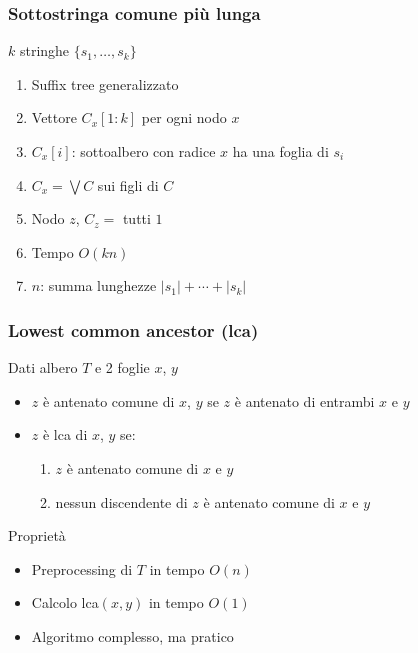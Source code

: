 \begin{frame}[fragile]
\frametitle{Sottostringa comune più lunga}
\begin{block}{$k$ stringhe $\{s_{1}, \ldots , s_{k}\}$}
\begin{enumerate}[<+->]
\item
Suffix tree generalizzato
\item
Vettore $C_{x}[1:k]$ per ogni nodo $x$
\item
$C_{x}[i]$: sottoalbero con radice $x$ ha una foglia di $s_{i}$
\item
$C_{x} = \bigvee C$ sui figli di $C$
\item
Nodo $z$, $C_{z}=$ tutti ${1}$
\item
Tempo $O(kn)$
\item
$n$: summa lunghezze $|s_{1}| + \cdots + |s_{k}|$
\end{enumerate}
\end{block}
\end{frame}


\begin{frame}[fragile]
\frametitle{Lowest common ancestor (lca)}
\begin{block}{Dati albero $T$ e 2 foglie $x$, $y$}
\begin{itemize}
\item
$z$ è antenato comune di $x$, $y$ se
$z$ è antenato di entrambi $x$ e $y$
\item
$z$ è lca di $x$, $y$ se:
\begin{enumerate}
\item
$z$ è antenato comune di $x$ e $y$
\item
nessun discendente di $z$ è antenato comune di $x$ e $y$
\end{enumerate}
\end{itemize}
\end{block}
\begin{block}{Proprietà}
\begin{itemize}
\item
Preprocessing di $T$ in tempo $O(n)$
\item
Calcolo lca$(x,y)$ in tempo $O(1)$
\item
Algoritmo complesso, ma pratico
\end{itemize}
\end{block}
\end{frame}



